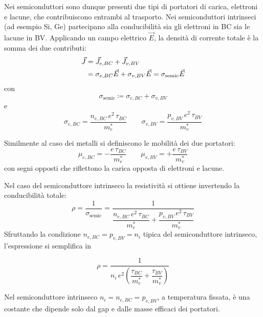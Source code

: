 Nei semiconduttori sono dunque presenti due tipi di portatori di carica, elettroni e lacune, che contribuiscono entrambi al trasporto. Nei semiconduttori intrinseci (ad esempio Si, Ge) partecipano alla conducibilità sia gli elettroni in BC sia le lacune in BV. Applicando un campo elettrico \( \vec{E} \), la densità di corrente totale è la somma dei due contributi:
\begin{align}
    \vec{J} &= \vec{J}_{e, BC} + \vec{J}_{v, BV} \notag \\
        &= \sigma_{e, BC} \vec{E} + \sigma_{v, BV} \vec{E} = \sigma_{\text{semic}} \vec{E}
\end{align}
con
\begin{equation}
    \sigma_{\text{semic}} \coloneqq \sigma_{e, BC} + \sigma_{v, BV}
\end{equation}
e
\begin{equation}
    \sigma_{e, BC} = \frac{n_{e, BC} \, e^2 \, \tau_{BC}}{m_e^*}
    \qquad
    \sigma_{v, BV} = \frac{p_{v, BV} \, e^2 \, \tau_{BV}}{m_v^*}
\end{equation}

Similmente al caso dei metalli si definiscono le mobilità dei due portatori:
\begin{equation}
    \mu_{e, BC} = -\frac{e \, \tau_{BC}}{m_e^*}
    \qquad
    \mu_{v, BV} = +\frac{e \, \tau_{BV}}{m_v^*}
\end{equation}
con segni opposti che riflettono la carica opposta di elettroni e lacune.

Nel caso del semiconduttore intrinseco la resistività si ottiene invertendo la conducibilità totale:
\begin{equation}
    \rho = \frac{1}{\sigma_{\text{semic}}} = \frac{1}{\dfrac{n_{e, BC} \, e^2 \, \tau_{BC}}{m_e^*} + \dfrac{p_{v, BV} \, e^2 \, \tau_{BV}}{m_v^*}}
\end{equation}
Sfruttando la condizione \( n_{e, BC} = p_{v, BV} = n_i \) tipica del semiconduttore intrinseco, l'espressione si semplifica in
\begin{importantbox}
    \begin{equation}
        \rho = \frac{1}{n_i \, e^2 \left( \dfrac{\tau_{BC}}{m_e^*} + \dfrac{\tau_{BV}}{m_v^*} \right)}
    \end{equation}
\end{importantbox}

\begin{attention}
    Nel semiconduttore intrinseco \( n_i = n_{e, BC} = p_{v, BV} \), a temperatura fissata, è una costante che dipende solo dal gap e dalle masse efficaci dei portatori.
\end{attention}

